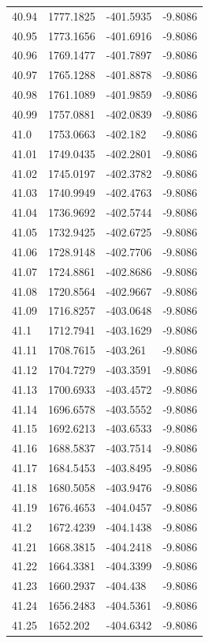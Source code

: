 \begin{table}[H]
\begin{tabular}{llll}
40.94 & 1777.1825 & -401.5935 & -9.8086 \\
40.95 & 1773.1656 & -401.6916 & -9.8086 \\
40.96 & 1769.1477 & -401.7897 & -9.8086 \\
40.97 & 1765.1288 & -401.8878 & -9.8086 \\
40.98 & 1761.1089 & -401.9859 & -9.8086 \\
40.99 & 1757.0881 & -402.0839 & -9.8086 \\
41.0 & 1753.0663 & -402.182 & -9.8086 \\
41.01 & 1749.0435 & -402.2801 & -9.8086 \\
41.02 & 1745.0197 & -402.3782 & -9.8086 \\
41.03 & 1740.9949 & -402.4763 & -9.8086 \\
41.04 & 1736.9692 & -402.5744 & -9.8086 \\
41.05 & 1732.9425 & -402.6725 & -9.8086 \\
41.06 & 1728.9148 & -402.7706 & -9.8086 \\
41.07 & 1724.8861 & -402.8686 & -9.8086 \\
41.08 & 1720.8564 & -402.9667 & -9.8086 \\
41.09 & 1716.8257 & -403.0648 & -9.8086 \\
41.1 & 1712.7941 & -403.1629 & -9.8086 \\
41.11 & 1708.7615 & -403.261 & -9.8086 \\
41.12 & 1704.7279 & -403.3591 & -9.8086 \\
41.13 & 1700.6933 & -403.4572 & -9.8086 \\
41.14 & 1696.6578 & -403.5552 & -9.8086 \\
41.15 & 1692.6213 & -403.6533 & -9.8086 \\
41.16 & 1688.5837 & -403.7514 & -9.8086 \\
41.17 & 1684.5453 & -403.8495 & -9.8086 \\
41.18 & 1680.5058 & -403.9476 & -9.8086 \\
41.19 & 1676.4653 & -404.0457 & -9.8086 \\
41.2 & 1672.4239 & -404.1438 & -9.8086 \\
41.21 & 1668.3815 & -404.2418 & -9.8086 \\
41.22 & 1664.3381 & -404.3399 & -9.8086 \\
41.23 & 1660.2937 & -404.438 & -9.8086 \\
41.24 & 1656.2483 & -404.5361 & -9.8086 \\
41.25 & 1652.202 & -404.6342 & -9.8086 \\

\end{tabular}
\end{table}
